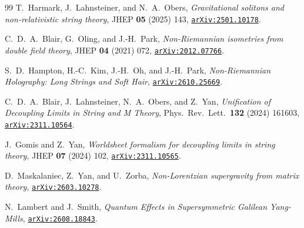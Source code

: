 \documentclass[11pt]{article}
\begin{document}
\begin{thebibliography}{99}
T.~Harmark, J.~Lahnsteiner, and N.~A.~Obers, \textit{Gravitational solitons and non-relativistic string theory}, JHEP \textbf{05} (2025) 143, \href{https://inspirehep.net/literature/2870182}{\texttt{arXiv:2501.10178}}.

C.~D.~A.~Blair, G.~Oling, and J.-H.~Park, \textit{Non-Riemannian isometries from double field theory}, JHEP \textbf{04} (2021) 072, \href{https://inspirehep.net/literature/1836436}{\texttt{arXiv:2012.07766}}.

S.~D.~Hampton, H.-C.~Kim, J.-H.~Oh, and J.-H.~Park, \textit{Non-Riemannian Holography: Long Strings and Soft Hair}, \href{https://inspirehep.net/literature/3216322}{\texttt{arXiv:2610.25669}}.

C.~D.~A.~Blair, J.~Lahnsteiner, N.~A.~Obers, and Z.~Yan, \textit{Unification of Decoupling Limits in String and M Theory}, Phys.\ Rev.\ Lett.\ \textbf{132} (2024) 161603, \href{https://inspirehep.net/literature/2724720}{\texttt{arXiv:2311.10564}}.

J.~Gomis and Z.~Yan, \textit{Worldsheet formalism for decoupling limits in string theory}, JHEP \textbf{07} (2024) 102, \href{https://inspirehep.net/literature/2724719}{\texttt{arXiv:2311.10565}}.

D.~Maskalaniec, Z.~Yan, and U.~Zorba, \textit{Non-Lorentzian supergravity from matrix theory}, \href{https://inspirehep.net/literature/3128477}{\texttt{arXiv:2603.10278}}.

N.~Lambert and J.~Smith, \textit{Quantum Effects in Supersymmetric Galilean Yang-Mills}, \href{https://inspirehep.net/literature/3192684}{\texttt{arXiv:2608.18843}}.

\end{thebibliography}
\endgroup
\end{document}
